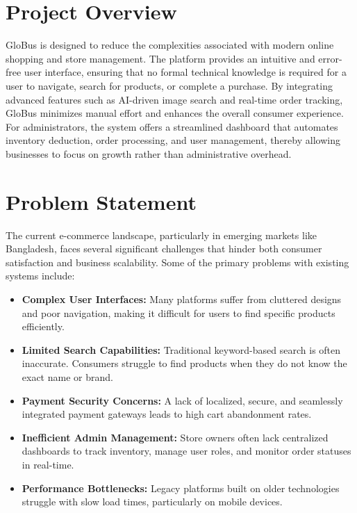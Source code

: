 \section{Project Overview}
GloBus is designed to reduce the complexities associated with modern online shopping and store management. The platform provides an intuitive and error-free user interface, ensuring that no formal technical knowledge is required for a user to navigate, search for products, or complete a purchase. By integrating advanced features such as AI-driven image search and real-time order tracking, GloBus minimizes manual effort and enhances the overall consumer experience. For administrators, the system offers a streamlined dashboard that automates inventory deduction, order processing, and user management, thereby allowing businesses to focus on growth rather than administrative overhead.

\section{Problem Statement}
The current e-commerce landscape, particularly in emerging markets like Bangladesh, faces several significant challenges that hinder both consumer satisfaction and business scalability. Some of the primary problems with existing systems include:
\begin{itemize}
    \item \textbf{Complex User Interfaces:} Many platforms suffer from cluttered designs and poor navigation, making it difficult for users to find specific products efficiently.
    
    \item \textbf{Limited Search Capabilities:} Traditional keyword-based search is often inaccurate. Consumers struggle to find products when they do not know the exact name or brand.
    
    \item \textbf{Payment Security Concerns:} A lack of localized, secure, and seamlessly integrated payment gateways leads to high cart abandonment rates.
    
    \item \textbf{Inefficient Admin Management:} Store owners often lack centralized dashboards to track inventory, manage user roles, and monitor order statuses in real-time.
    
    \item \textbf{Performance Bottlenecks:} Legacy platforms built on older technologies struggle with slow load times, particularly on mobile devices.
\end{itemize}

